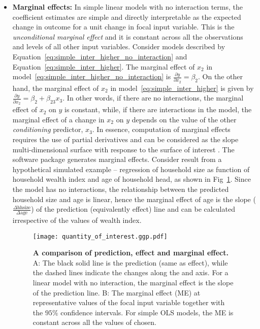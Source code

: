 \begin{itemize}
\item \textbf{Marginal effects:} In simple linear models with no interaction terms, the coefficient estimates are simple and directly interpretable as the expected change in outcome for a unit change in focal input variable. This is the \emph{unconditional marginal effect} and it is constant across all the observations and levels of all other input variables. Consider models described by Equation~\ref{eq:simple_inter_higher_no_interaction} and Equation~\ref{eq:simple_inter_higher}. The marginal effect of $x_2$ in model~\ref{eq:simple_inter_higher_no_interaction} is $\frac{\partial y}{\partial x_2} = \beta_2$. On the other hand, the marginal effect of $x_2$ in model~\ref{eq:simple_inter_higher} is given by $\frac{\partial y}{\partial x_2} = \beta_2 + \beta_{23}x_3$. In other words, if there are no interactions, the marginal effect of $x_2$ on $y$ is constant, while, if there are interactions in the model, the marginal effect of a change in $x_2$ on $y$ depends on the value of the other \emph{conditioning} predictor, $x_3$. In essence, computation of marginal effects requires the use of partial derivatives and can be considered as the slope multi-dimensional surface with response to the surface of interest \cite{leeper2017interpreting}. The  software package  \cite{lenth2018package} generates marginal effects. Consider result from a hypothetical  simulated example -- regression of household size as function of household wealth index and age of household head, as shown in Fig~\ref{fig:qoi_age_pred_plot}. Since the model has no interactions, the relationship between the predicted household size and age is linear, hence the marginal effect of age is the slope ($\frac{\Delta \mathrm{hh size}}{\Delta \mathrm{age}}$) of the prediction (equivalently effect) line and can be calculated irrespective of the values of wealth index.
%
\begin{figure}[!h]
\centering
\texttt{[image: quantity\_of\_interest.ggp.pdf]}
\caption{{\bf A comparison of prediction, effect and marginal effect.} A: The black solid line is the prediction (same as effect), while the dashed lines indicate the changes along the  and  axis. For a linear model with no interaction, the marginal effect is the slope of the prediction line. B: The marginal effect (ME) at representative values of the focal input variable  together with the $95\%$ confidence intervals. For simple OLS models, the ME is constant across all the values of  chosen.}
\label{fig:qoi_age_pred_plot}
\end{figure}
%
\end{itemize}



